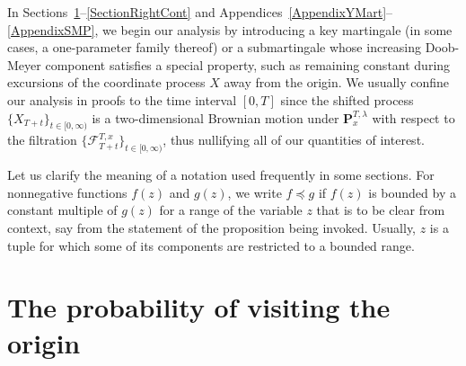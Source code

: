 \documentclass[10pt]{article}
\numberwithin{equation}{section}
\theoremstyle{definition}
\begin{document}
In   Sections~\ref{SectionOriginEvent}--\ref{SectionRightCont} and Appendices~\ref{AppendixYMart}--\ref{AppendixSMP}, we begin our analysis by introducing a key martingale  (in some cases, a one-parameter family thereof) or a submartingale whose increasing Doob-Meyer component satisfies a special property, such as remaining constant during excursions of the coordinate process $X$ away from the origin.  We usually confine our analysis in proofs to the time interval $[0,T]$  since the shifted process $\{X_{T +t}\}_{t\in [0,\infty)} $ is a  two-dimensional Brownian motion under  $\mathbf{P}_x^{T,\lambda}$ with respect to the filtration $\{ \mathscr{F}^{T,x}_{T+t}\}_{t\in [0,\infty)}$, thus nullifying all of our quantities of interest. 




Let us  clarify the meaning of a notation used frequently in some sections.  For  nonnegative functions $f(z)$ and $g(z)$, we  write $f\preceq g$  if $f(z)$ is bounded by a constant multiple of $g(z)$ for a range of the variable $z$ that is  to be clear from context, say from the statement of the proposition being invoked.  Usually, $z$ is a tuple for which some of its components are restricted to a bounded range.


\section{The probability of visiting the  origin} \label{SectionOriginEvent}
\end{document}
